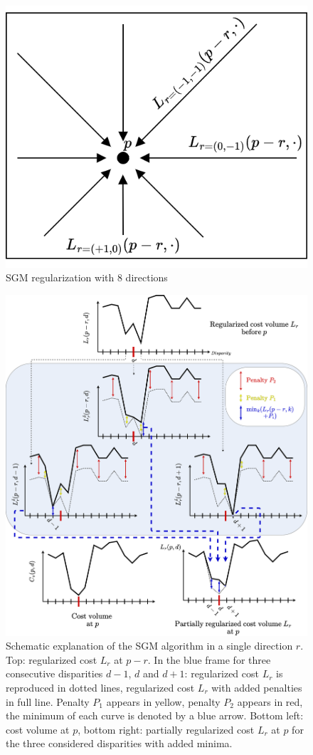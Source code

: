 \begin{figure}
	\centering
	\includegraphics[width=0.5\linewidth]{Images/Chap_1/SGM_directions.png}
	\caption{SGM regularization with $8$ directions}
	\label{fig:sgm_directions}
\end{figure}

\begin{figure}
	\centering
	\includegraphics[width=\linewidth]{Images/Chap_1/SGM.png}
	\caption{Schematic explanation of the SGM algorithm in a single direction $r$. Top: regularized cost $L_r$ at $p-r$. In the blue frame for three consecutive disparities $d-1$, $d$ and $d+1$: regularized cost $L_r$ is reproduced in dotted lines, regularized cost $L_r$ with added penalties in full line. Penalty $P_1$ appears in yellow, penalty $P_2$ appears in red, the minimum of each curve is denoted by a blue arrow. Bottom left: cost volume at $p$, bottom right: partially regularized cost $L_r$ at $p$ for the three considered disparities with added minima.}
	\label{fig:sgm}
\end{figure}

